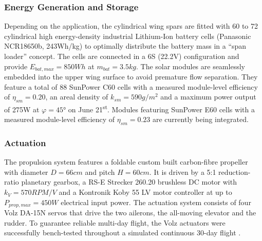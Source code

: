\subsubsection{Energy Generation and Storage}
Depending on the application, the cylindrical wing spars are fitted with 60 to 72 cylindrical high energy-density industrial Lithium-Ion battery cells (Panasonic NCR18650b, 243Wh/kg) to optimally distribute the battery mass in a ``span loader'' concept. The cells are connected in a 6S (22.2V) configuration and provide $E_{bat,max}=850Wh$ at $m_{bat}=3.5kg$. The solar modules are seamlessly embedded into the upper wing surface to avoid premature flow separation. They feature a total of 88 SunPower C60 cells with a measured module-level efficiency of $\eta_{sm}=0.20$, an areal density of $k_{sm}=590g/m^2$ and a maximum power output of 275W at $\varphi=45°$ on June 21\textsuperscript{st}. Modules featuring SunPower E60 cells with a measured \cite{Sunier_EPFLSolarModules} module-level efficiency of $\eta_{sm}=0.23$ are currently being integrated.

\subsubsection{Actuation}
The propulsion system features a foldable custom built carbon-fibre propeller with diameter $D=66cm$ and pitch $H=60cm$. It is driven by a 5:1 reduction-ratio planetary gearbox, a RS-E Strecker 260.20 brushless DC motor with $k_V=570RPM/V$ and a Kontronik Koby 55 LV motor controller at up to $P_{prop,max}=450W$ electrical input power. The actuation system consists of four Volz DA-15N servos that drive the two ailerons, the all-moving elevator and the rudder. To guarantee reliable multi-day flight, the Volz actuators were successfully bench-tested throughout a simulated continuous 30-day flight \cite{DellaCa_BT}.

